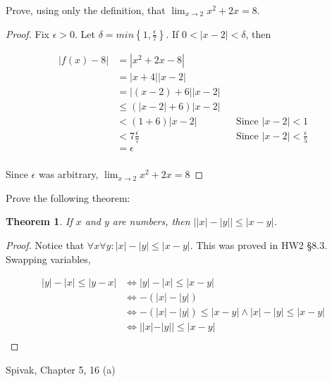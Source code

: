 \documentclass{article} %
\theoremstyle{plain}
\newtheorem*{theorem*}{Theorem}
\theoremstyle{definition}
\newcommand{\abs}[1]{\left\lvert #1 \right\rvert} %
\begin{document}
\noindent{} Prove, using only the definition, that $\lim_{x \rightarrow 2} x^2+2x = 8$. 

\begin{proof} 
    Fix $\epsilon > 0$.  Let $\delta = min\left\{1, \frac{\epsilon}{7} \right\}$. If $0 < |x-2| < \delta$, then

    \begin{align*}
        |f(x) - 8| &= |x^2 + 2x - 8| & & \\
                   &= |x+4| |x-2| & & \\
                   &= |(x-2)+6| |x-2| & & \\
                   &\leq (|x-2| + 6) |x-2| & & \\
                   &< (1 + 6) |x-2| & & \text{Since $|x-2| < 1$} \\
                   &< 7 \frac{\epsilon}{7} & & \text{Since $|x-2| < \frac{\epsilon}{5}$} \\
                   &= \epsilon & & \\
    \end{align*}

    Since $\epsilon$ was arbitrary, $\lim_{x \rightarrow 2} x^2 + 2x = 8$
\end{proof} 

\noindent{} Prove the following theorem: 

\begin{theorem*} If $x$ and $y$ are numbers, then $\abs{\abs{x}-\abs{y}} \leq \abs{x-y}$. 
\end{theorem*}

\begin{proof}
    Notice that $\forall x \forall y:  |x| - |y| \leq |x - y|$.  This was proved in HW2 \S 8.3.  Swapping variables,

    \begin{align*}
        |y| - |x| \leq |y - x| & \Leftrightarrow |y| - |x| \leq |x - y| \\
        & \Leftrightarrow -(|x| - |y|) \\
        & \Leftrightarrow -(|x| - |y|) \leq |x - y| \land |x| - |y| \leq |x-y| \\
        & \Leftrightarrow ||x| - |y|| \leq |x - y| \\
    \end{align*}

\end{proof} 


\noindent{} Spivak, Chapter 5,  16 (a)
\end{document}

